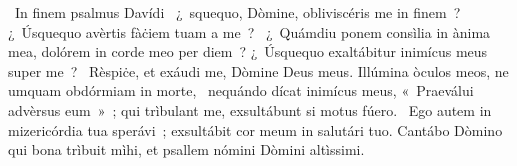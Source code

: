 {~In finem psalmus Davídi}
{%
~¿~squequo, Dòmine, obliviscéris me in finem~? ¿~Úsquequo avèrtis fàċiem tuam a me~?
~¿~Quámdiu ponem consìlia in ànima mea, dolórem in corde meo per diem~? ¿~Úsquequo exaltábitur inimícus meus super me~?
~Rèspiċe, et exáudi me, Dòmine Deus meus. Illúmina òculos meos, ne umquam obdórmiam in morte,
~nequándo dícat inimícus meus, «~Praeválui advèrsus eum~»~; qui trìbulant me, exsultábunt si motus fúero.
~Ego autem in mizericórdia tua sperávi~; exsultábit cor meum in salutári tuo. Cantábo Dòmino qui bona trìbuit mìhi, et psallem nómini Dòmini altìssimi.
}

